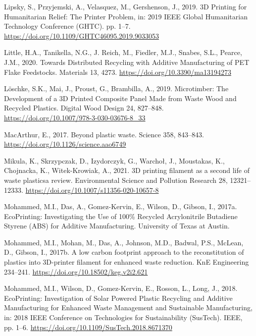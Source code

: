 \documentclass[
  12pt,
  number,
  review]{elsarticle}
\newlength{\cslhangindent}
\newlength{\cslentryspacingunit} %
\newenvironment{CSLReferences}[2] %
 {%
  \setlength{\parindent}{0pt}
  \ifodd #1
  \let\oldpar\par
  \def\par{\hangindent=\cslhangindent\oldpar}
  \fi
  \setlength{\parskip}{#2\cslentryspacingunit}
 }%
 {}
\begin{document}
\begin{CSLReferences}{1}{0}
\leavevmode{}%
Lipsky, S., Przyjemski, A., Velasquez, M., Gershenson, J., 2019. {3D
Printing} for {Humanitarian Relief}: {The Printer Problem}, in: 2019
{IEEE Global Humanitarian Technology Conference} ({GHTC}). pp. 1--7.
\url{https://doi.org/10.1109/GHTC46095.2019.9033053}

\leavevmode{}%
Little, H.A., Tanikella, N.G., J. Reich, M., Fiedler, M.J., Snabes,
S.L., Pearce, J.M., 2020. Towards {Distributed Recycling} with {Additive
Manufacturing} of {PET Flake Feedstocks}. Materials 13, 4273.
\url{https://doi.org/10.3390/ma13194273}

\leavevmode{}%
Löschke, S.K., Mai, J., Proust, G., Brambilla, A., 2019. Microtimber:
{The Development} of a {3D Printed Composite Panel Made} from {Waste
Wood} and {Recycled Plastics}. Digital Wood Design 24, 827--848.
\url{https://doi.org/10.1007/978-3-030-03676-8_33}

\leavevmode{}%
MacArthur, E., 2017. Beyond plastic waste. Science 358, 843--843.
\url{https://doi.org/10.1126/science.aao6749}

\leavevmode{}%
Mikula, K., Skrzypczak, D., Izydorczyk, G., Warchoł, J., Moustakas, K.,
Chojnacka, K., Witek-Krowiak, A., 2021. {3D} printing filament as a
second life of waste plastics\textemdash a review. Environmental Science
and Pollution Research 28, 12321--12333.
\url{https://doi.org/10.1007/s11356-020-10657-8}

\leavevmode{}%
Mohammed, M.I., Das, A., Gomez-Kervin, E., Wilson, D., Gibson, I.,
2017a. {EcoPrinting}: {Investigating} the {Use} of 100\% {Recycled
Acrylonitrile Butadiene Styrene} ({ABS}) for {Additive Manufacturing}.
{University of Texas at Austin}.

\leavevmode{}%
Mohammed, M.I., Mohan, M., Das, A., Johnson, M.D., Badwal, P.S., McLean,
D., Gibson, I., 2017b. A low carbon footprint approach to the
reconstitution of plastics into {3D-printer} filament for enhanced waste
reduction. KnE Engineering 234--241.
\url{https://doi.org/10.18502/keg.v2i2.621}

\leavevmode{}%
Mohammed, M.I., Wilson, D., Gomez-Kervin, E., Rosson, L., Long, J.,
2018. {EcoPrinting}: {Investigation} of {Solar Powered Plastic
Recycling} and {Additive Manufacturing} for {Enhanced Waste Management}
and {Sustainable Manufacturing}, in: 2018 {IEEE Conference} on
{Technologies} for {Sustainability} ({SusTech}). {IEEE}, pp. 1--6.
\url{https://doi.org/10.1109/SusTech.2018.8671370}


\end{CSLReferences}
\end{document}
